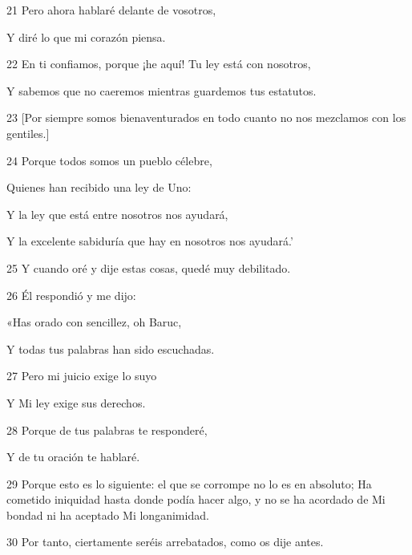 \par 21 Pero ahora hablaré delante de vosotros,

\par Y diré lo que mi corazón piensa.

\par 22 En ti confiamos, porque ¡he aquí! Tu ley está con nosotros,

\par Y sabemos que no caeremos mientras guardemos tus estatutos.

\par 23 [Por siempre somos bienaventurados en todo cuanto no nos mezclamos con los gentiles.]

\par 24 Porque todos somos un pueblo célebre,

\par Quienes han recibido una ley de Uno:

\par Y la ley que está entre nosotros nos ayudará,

\par Y la excelente sabiduría que hay en nosotros nos ayudará.'

\par 25 Y cuando oré y dije estas cosas, quedé muy debilitado.

\par 26 Él respondió y me dijo:

\par «Has orado con sencillez, oh Baruc,

\par Y todas tus palabras han sido escuchadas.

\par 27 Pero mi juicio exige lo suyo

\par Y Mi ley exige sus derechos.

\par 28 Porque de tus palabras te responderé,

\par Y de tu oración te hablaré.

\par 29 Porque esto es lo siguiente: el que se corrompe no lo es en absoluto; Ha cometido iniquidad hasta donde podía hacer algo, y no se ha acordado de Mi bondad ni ha aceptado Mi longanimidad.

\par 30 Por tanto, ciertamente seréis arrebatados, como os dije antes.

